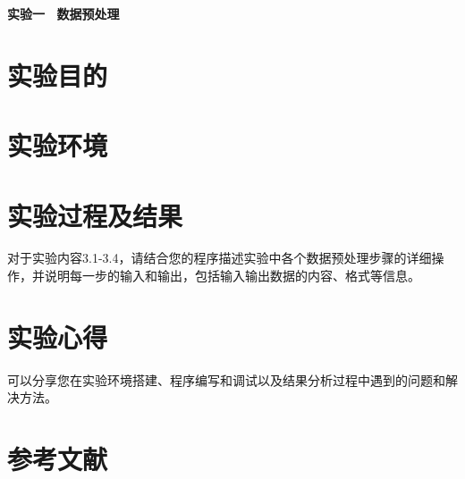 \documentclass{ML}
\begin{document}
\maketitle

\newpage

\begin{center}
    \textbf{ 实验一 \  数据预处理}
\end{center}

\section{实验目的}

\section{实验环境}

\section{实验过程及结果}
对于实验内容3.1-3.4，请结合您的程序描述实验中各个数据预处理步骤的详细操作，并说明每一步的输入和输出，包括输入输出数据的内容、格式等信息。
\section{实验心得}
可以分享您在实验环境搭建、程序编写和调试以及结果分析过程中遇到的问题和解决方法。
\appendix

\section{参考文献}
\end{document}
